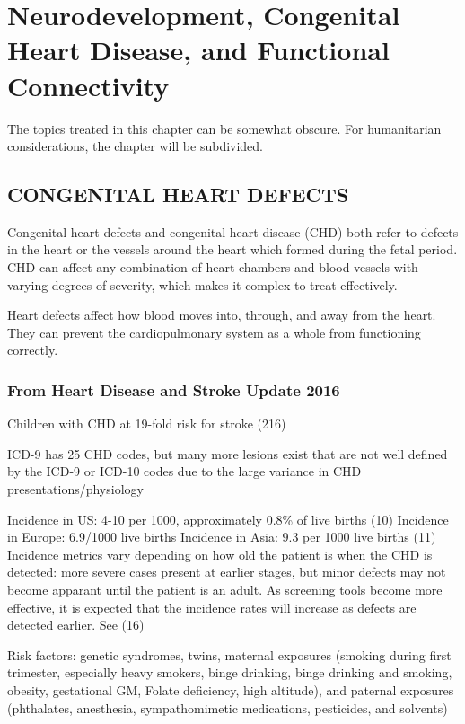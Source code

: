 \chapter{Neurodevelopment, Congenital Heart Disease, and Functional Connectivity}
The topics treated in this chapter can be somewhat obscure. For humanitarian considerations, the chapter will be subdivided.

\section{CONGENITAL HEART DEFECTS}

Congenital heart defects and congenital heart disease (CHD) both refer to defects in the heart or the vessels around the heart which formed during the fetal period. CHD can affect any combination of heart chambers and blood vessels with varying degrees of severity, which makes it complex to treat effectively.

Heart defects affect how blood moves into, through, and away from the heart. They can prevent the cardiopulmonary system as a whole from functioning correctly.

\subsection{From Heart Disease and Stroke Update 2016}
Children with CHD at 19-fold risk for stroke (216)

ICD-9 has 25 CHD codes, but many more lesions exist that are not well defined by the ICD-9 or ICD-10 codes due to the large variance in CHD presentations/physiology

Incidence in US: 4-10 per 1000, approximately 0.8\% of live births (10)
Incidence in Europe: 6.9/1000 live births
Incidence in Asia: 9.3 per 1000 live births (11)
Incidence metrics vary depending on how old the patient is when the CHD is detected: more severe cases present at earlier stages, but minor defects may not become apparant until the patient is an adult. As screening tools become more effective, it is expected that the incidence rates will increase as defects are detected earlier.
See (16)

Risk factors: genetic syndromes, twins, maternal exposures (smoking during first trimester, especially heavy smokers, binge drinking, binge drinking and smoking, obesity, gestational GM, Folate deficiency, high altitude), and paternal exposures (phthalates, anesthesia, sympathomimetic medications, pesticides, and solvents)

